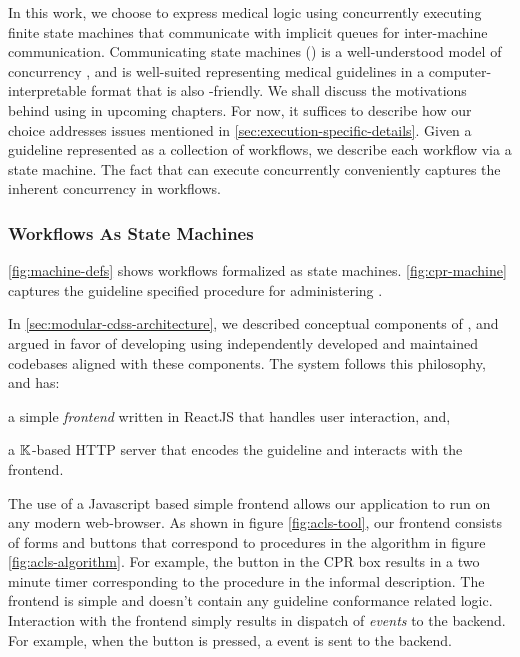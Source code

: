 In this work, we choose to express medical logic using
concurrently executing finite state machines that communicate
with implicit queues for inter-machine communication. Communicating
state machines (\CSMs{}) is a well-understood model of concurrency
\cite{BrandJACM83}, and is well-suited  representing medical guidelines in a
computer-interpretable format that is also \HCP{}-friendly.
We shall discuss the motivations behind using \CSMs{} in upcoming
chapters. For now, it suffices to describe how our choice addresses
issues mentioned in \autoref{sec:execution-specific-details}.
Given a guideline represented as a collection of workflows, we
describe each workflow via a state machine. The fact that
\CSMs{} can execute concurrently conveniently captures the
inherent concurrency in workflows.

\subsubsection{\ACLS{} Workflows As State Machines}

\autoref{fig:machine-defs} shows \ACLS{} workflows formalized
as state machines. \autoref{fig:cpr-machine} captures the
guideline specified procedure for administering \CPR{}.

In \autoref{sec:modular-cdss-architecture}, we described
conceptual components of \CDSSs{}, and argued in favor
of developing \CDSSs{} using independently developed and maintained codebases
aligned with these components. The \KACLS{} system follows
this philosophy, and has:
\begin{enumerate*}[label=(\roman*)]
  \item a simple \emph{frontend} written in ReactJS that handles
    user interaction, and,
  \item a $\mathbb{K}$-based HTTP server that encodes the \ACLS{} guideline
    and interacts with the frontend.
\end{enumerate*}
The use of a Javascript based simple frontend allows our application
to run on any modern web-browser. As shown in figure \ref{fig:acls-tool},
our frontend consists of forms and buttons that correspond to procedures
in the algorithm in figure \ref{fig:acls-algorithm}. For example, the
 button in the CPR box results in a two minute timer corresponding
to the  procedure in the informal description.
The frontend is simple and doesn't contain any guideline conformance related
logic. Interaction with the frontend simply results in dispatch of
\textit{events} to the backend. For example, when the  button is pressed, a
 event is sent to the backend.






